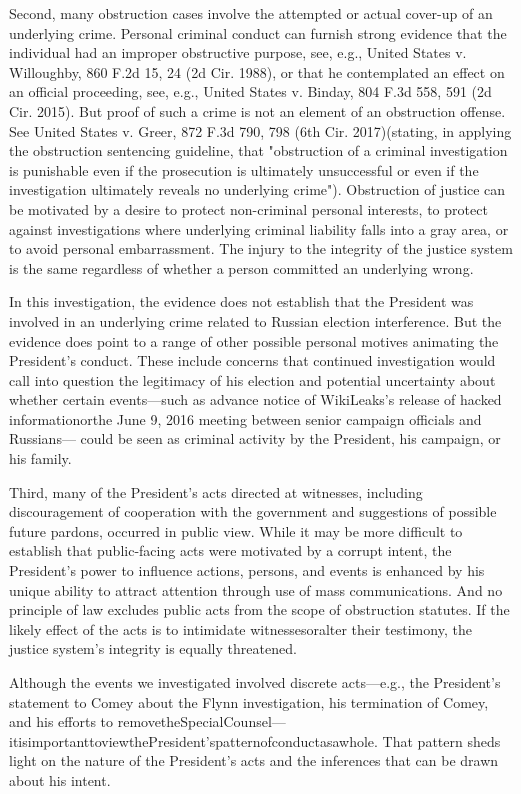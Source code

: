 {Second, many obstruction cases involve the attempted or actual cover-up of an underlying crime.
Personal criminal conduct can furnish strong evidence that the individual had an improper obstructive purpose, see, e.g., United States v. Willoughby, 860 F.2d 15, 24 (2d Cir. 1988), or that he contemplated an effect on an official proceeding, see, e.g., United States v. Binday, 804 F.3d 558, 591 (2d Cir. 2015).
But proof of such a crime is not an element of an obstruction offense.
See United States v. Greer, 872 F.3d 790, 798 (6th Cir. 2017)(stating, in applying the obstruction sentencing guideline, that "obstruction of a criminal investigation is punishable even if the prosecution is ultimately unsuccessful or even if the investigation ultimately reveals no underlying crime").
Obstruction of justice can be motivated by a desire to protect non-criminal personal interests, to protect against investigations where underlying criminal liability falls into a gray area, or to avoid personal embarrassment.
The injury to the integrity of the justice system is the same regardless of whether a person committed an underlying wrong.

In this investigation, the evidence does not establish that the President was involved in an underlying crime related to Russian election interference.
But the evidence does point to a range of other possible personal motives animating the President's conduct.
These include concerns that continued investigation would call into question the legitimacy of his election and potential uncertainty about whether certain events—such as advance notice of WikiLeaks's release of hacked informationorthe June 9, 2016 meeting between senior campaign officials and Russians— could be seen as criminal activity by the President, his campaign, or his family.

Third, many of the President's acts directed at witnesses, including discouragement of cooperation with the government and suggestions of possible future pardons, occurred in public view.
While it may be more difficult to establish that public-facing acts were motivated by a corrupt intent, the President's power to influence actions, persons, and events is enhanced by his unique ability to attract attention through use of mass communications.
And no principle of law excludes public acts from the scope of obstruction statutes.
If the likely effect of the acts is to intimidate witnessesoralter their testimony, the justice system's integrity is equally threatened.

Although the events we investigated involved discrete acts—e.g., the President's statement to Comey about the Flynn investigation, his termination of Comey, and his efforts to removetheSpecialCounsel—itisimportanttoviewthePresident'spatternofconductasawhole.
That pattern sheds light on the nature of the President's acts and the inferences that can be drawn about his intent.

}
